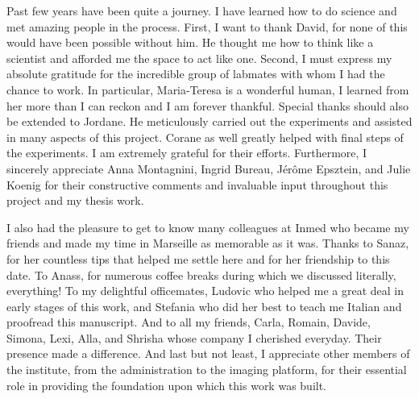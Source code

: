 Past few years have been quite a journey.
I have learned how to do science and met amazing people in the process.
First, I want to thank David, for none of this would have been possible without him.
He thought me how to think like a scientist and afforded me the space to act like one.
Second, I must express my absolute gratitude for the incredible group of labmates with whom I had the chance to work.
In particular, Maria-Teresa is a wonderful human, I learned from her more than I can reckon and I am forever thankful.
Special thanks should also be extended to Jordane.
He meticulously carried out the experiments and assisted in many aspects of this project.
Corane as well greatly helped with final steps of the experiments.
I am extremely grateful for their efforts.
Furthermore, I sincerely appreciate Anna Montagnini, Ingrid Bureau, J\'{e}r\^{o}me Epsztein, and Julie Koenig for their constructive comments and invaluable input throughout this project and my thesis work.
\par
I also had the pleasure to get to know many colleagues at Inmed who became my friends and made my time in Marseille as memorable as it was.
Thanks to Sanaz, for her countless tips that helped me settle here and for her friendship to this date.
To Anass, for numerous coffee breaks during which we discussed literally, everything!
To my delightful officemates, Ludovic who helped me a great deal in early stages of this work, and Stefania who did her best to teach me Italian and proofread this manuscript.
And to all my friends, Carla, Romain, Davide, Simona, Lexi, Alla, and Shrisha whose company I cherished everyday.
Their presence made a difference.
And last but not least, I appreciate other members of the institute, from the administration to the imaging platform, for their essential role in providing the foundation upon which this work was built.